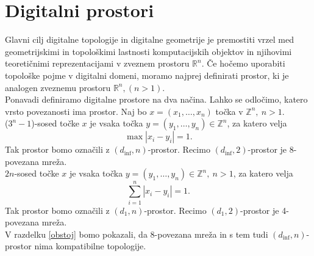 \documentclass[a4paper, 12pt]{book}
\theoremstyle{definition}
\theoremstyle{remark}
\begin{document}
\chapter{Digitalni prostori}
Glavni cilj digitalne topologije in digitalne geometrije je premostiti vrzel
med geometrijskimi in topološkimi lastnosti komputacijskih objektov in njihovimi
teoretičnimi reprezentacijami v zveznem prostoru $\mathbb{R}^n$. Če hočemo uporabiti
topološke pojme v digitalni domeni, moramo najprej definirati prostor, ki je
analogen zveznemu prostoru $\mathbb{R}^n, (n > 1)$.\\
Ponavadi definiramo digitalne prostore na dva načina. Lahko se odločimo, katero 
vrsto povezanosti ima prostor. Naj bo $x = (x_1,\dots,x_n)$
točka v $\mathbb{Z}^n,\ n > 1$.\\
  ($3^n-1$)-sosed točke $x$ je vsaka točka
  $y = (y_1,\dots,y_n) \in \mathbb{Z}^n$, za katero velja
  \[
    \max|x_i - y_i| = 1 \text{.}
  \]
  Tak prostor bomo označili z $(d_{\inf},n)$-prostor.
  Recimo $(d_{\inf},2)$-prostor je 8-povezana mreža.\\
  $2n$-sosed točke $x$ je vsaka točka $y = (y_1,\dots,y_n) \in \mathbb{Z}^n,\ n > 1$,
  za katero velja
  \[
    \sum_{i=1}^{n}|x_i - y_i| = 1 \text{.}
  \]
  Tak prostor bomo označili z $(d_1,n)$-prostor.
  Recimo $(d_1,2)$-prostor je 4-povezana mreža.\\
  V razdelku \ref{obstoj} bomo pokazali, da 8-povezana mreža in s tem tudi
  $(d_{\inf},n)$-prostor nima kompatibilne topologije.
\end{document}
